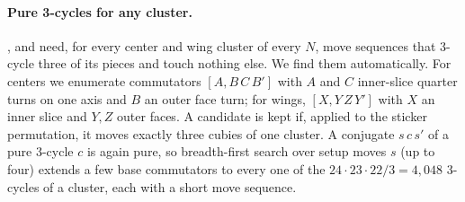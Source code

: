 \paragraph{Pure 3-cycles for any cluster.}
\Mtwo, \Mthree and \FiveC need, for every center and wing cluster of every $N$, move sequences that 3-cycle three of its
pieces and touch nothing else. We find them automatically. For centers we enumerate commutators $[A, B\,C\,B']$ with
$A$ and $C$ inner-slice quarter turns on one axis and $B$ an outer face turn; for wings, $[X, Y\,Z\,Y']$ with $X$ an
inner slice and $Y, Z$ outer faces. A candidate is kept if, applied to the sticker permutation, it moves exactly three
cubies of one cluster. A conjugate $s\,c\,s'$ of a pure 3-cycle $c$ is again pure, so breadth-first search over setup
moves $s$ (up to four) extends a few base commutators to every one of the $24\cdot23\cdot22/3=4{,}048$ 3-cycles of a
cluster, each with a short move sequence.
